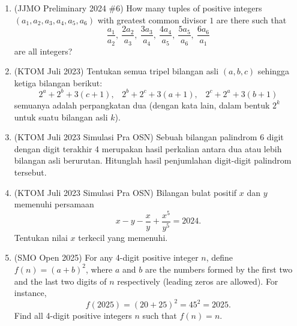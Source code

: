 \documentclass[11pt,letterpaper]{article}
\begin{document}
\begin{enumerate}[resume]
    \item (JJMO Preliminary 2024 \#6) How many tuples of positive integers $(a_1,a_2,a_3,a_4,a_5,a_6)$ with greatest common divisor $1$ are there such that
    \[ \frac{a_1}{a_2},\ \frac{2a_2}{a_3},\ \frac{3a_3}{a_4},\ \frac{4a_4}{a_5},\ \frac{5a_5}{a_6},\ \frac{6a_6}{a_1} \]
    are all integers?

    \item (KTOM Juli 2023) Tentukan semua tripel bilangan asli $(a,b,c)$ sehingga ketiga bilangan berikut:
    \[ 2^a+2^b+3(c+1), \hspace{10pt} 2^b+2^c+3(a+1), \hspace{10pt} 2^c+2^a+3(b+1) \]
    semuanya adalah perpangkatan dua (dengan kata lain, dalam bentuk $2^k$ untuk suatu bilangan asli $k$).

    \item (KTOM Juli 2023 Simulasi Pra OSN) Sebuah bilangan palindrom 6 digit dengan digit terakhir 4 merupakan hasil perkalian antara dua atau lebih bilangan asli berurutan. Hitunglah hasil penjumlahan digit-digit palindrom tersebut.

    \item (KTOM Juli 2023 Simulasi Pra OSN) Bilangan bulat positif $x$ dan $y$ memenuhi persamaan
    \[ x-y-\dfrac{x}{y}+\dfrac{x^5}{y^5}=2024. \]
    Tentukan nilai $x$ terkecil yang memenuhi.

    \item (SMO Open 2025) For any 4-digit positive integer $n$, define $f(n)=(a+b)^2$, where $a$ and $b$ are the numbers formed by the first two and the last two digits of $n$ respectively (leading zeros are allowed). For instance,
    \[ f(2025)=(20+25)^2=45^2=2025. \]
    Find all 4-digit positive integers $n$ such that $f(n)=n$.


\end{enumerate}
\end{document}
